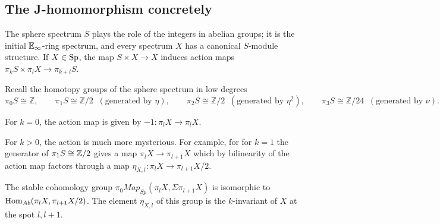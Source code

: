 \documentclass{amsart}
\begin{document}




\subsection{The J-homomorphism concretely}

The sphere spectrum $S$ plays the role of the integers in abelian groups; it is the initial $\mathbb{E}_\infty$-ring spectrum, and every spectrum $X$ has a canonical $S$-module structure.
If $X \in \operatorname{Sp}$, the map $S \times X \to X$ induces action maps $\pi_{k} S \times \pi_{l} X \to \pi_{k+l} S$.

Recall the homotopy groups of the sphere spectrum in low degrees~\cite{ravenel2003complex}
\[
\pi_0 S \cong \mathbb{Z}, \qquad
\pi_1 S \cong \mathbb{Z}/2 \;\; (\text{generated by } \eta), \qquad
\pi_2 S \cong \mathbb{Z}/2 \;\; (\text{generated by } \eta^2), \qquad
\pi_3 S \cong \mathbb{Z}/24 \;\; (\text{generated by } \nu).
\]

\begin{lemma}
For $k = 0$, the action map is given by $-1 \colon \pi_l X \to \pi_l X$.
\end{lemma}

For $k>0$, the action is much more mysterious. 
For example, for for $k = 1$ the generator of $\pi_1 S\cong \mathbb{Z}/2$ gives a map
    $\pi_l X \to \pi_{l+1} X$ which by bilinearity of the action map factors through a map $\eta_{X,l} \colon \pi_l X \to \pi_{l+1} X/2$.

\begin{lemma}
\label{lem:eta}
The stable cohomology group $\pi_0 Map_{Sp}(\pi_l X, \Sigma \pi_{l+1} X)$ is isomorphic to $\operatorname{Hom}_{Ab}(\pi_l X, \pi_{l+1} X/2)$.
The element $\eta_{X,l}$ of this group is the $k$-invariant of $X$ at the spot $l,l+1$.
\end{lemma}
\end{document}
